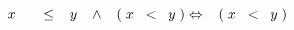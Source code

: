 \documentclass[12pt]{article}
\renewcommand{\qedsymbol}{$\blacksquare$}
\begin{document}
\begin{center}
    $x \hspace{0.3cm} \hspace{0.3cm} \leq \hspace{0.3cm} y \hspace{0.3cm} \wedge \hspace{0.3cm} (\hspace{0.1cm}x\hspace{0.2cm}<\hspace{0.2cm}y\hspace{0.1cm}) \Leftrightarrow \hspace{0.3cm} (\hspace{0.1cm}x\hspace{0.2cm}<\hspace{0.2cm}y\hspace{0.1cm})$ \hspace{.5cm} \textup{\black{\qedsymbol}} 
\end{center}\vspace{1cm}
\end{document}
